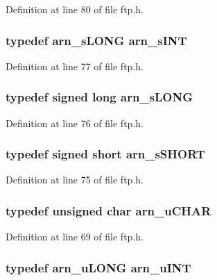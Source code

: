 Definition at line 80 of file ftp.h.

\hypertarget{group__ftp_ga5c55a910c7442d4a6c3d12e9b9456a6d}{
\subsubsection[{arn\_\-sINT}]{\setlength{\rightskip}{0pt plus 5cm}typedef {\bf arn\_\-sLONG} {\bf arn\_\-sINT}}}
\label{group__ftp_ga5c55a910c7442d4a6c3d12e9b9456a6d}


Definition at line 77 of file ftp.h.

\hypertarget{group__ftp_ga513c5078ef61e98f886e30e0160f9aed}{
\subsubsection[{arn\_\-sLONG}]{\setlength{\rightskip}{0pt plus 5cm}typedef signed long {\bf arn\_\-sLONG}}}
\label{group__ftp_ga513c5078ef61e98f886e30e0160f9aed}


Definition at line 76 of file ftp.h.

\hypertarget{group__ftp_gaf99068ab37d922a9909e69f2f438ba2a}{
\subsubsection[{arn\_\-sSHORT}]{\setlength{\rightskip}{0pt plus 5cm}typedef signed short {\bf arn\_\-sSHORT}}}
\label{group__ftp_gaf99068ab37d922a9909e69f2f438ba2a}


Definition at line 75 of file ftp.h.

\hypertarget{group__ftp_ga748121386e994966f8a87f4160f055b4}{
\subsubsection[{arn\_\-uCHAR}]{\setlength{\rightskip}{0pt plus 5cm}typedef unsigned char {\bf arn\_\-uCHAR}}}
\label{group__ftp_ga748121386e994966f8a87f4160f055b4}


Definition at line 69 of file ftp.h.

\hypertarget{group__ftp_gaa8482f09ead6db56dc88c28e93b6c403}{
\subsubsection[{arn\_\-uINT}]{\setlength{\rightskip}{0pt plus 5cm}typedef {\bf arn\_\-uLONG} {\bf arn\_\-uINT}}}
\label{group__ftp_gaa8482f09ead6db56dc88c28e93b6c403}



